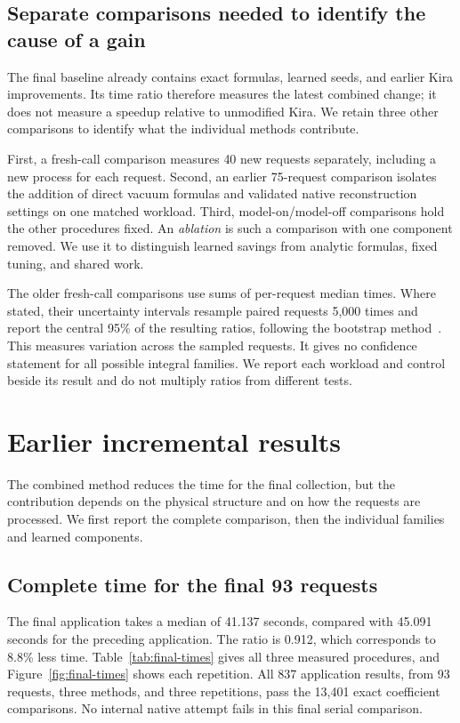 \subsection{Separate comparisons needed to identify the cause of a gain}
The final baseline already contains exact formulas, learned seeds, and earlier Kira improvements. Its time ratio therefore measures the latest combined change; it does not measure a speedup relative to unmodified Kira. We retain three other comparisons to identify what the individual methods contribute.

First, a fresh-call comparison measures 40 new requests separately, including a new process for each request. Second, an earlier 75-request comparison isolates the addition of direct vacuum formulas and validated native reconstruction settings on one matched workload. Third, model-on/model-off comparisons hold the other procedures fixed. An \emph{ablation} is such a comparison with one component removed. We use it to distinguish learned savings from analytic formulas, fixed tuning, and shared work.

The older fresh-call comparisons use sums of per-request median times. Where stated, their uncertainty intervals resample paired requests 5,000 times and report the central 95\% of the resulting ratios, following the bootstrap method~\cite{Efron1979}. This measures variation across the sampled requests. It gives no confidence statement for all possible integral families. We report each workload and control beside its result and do not multiply ratios from different tests.

\section{Earlier incremental results}
\label{app:latest-results}
The combined method reduces the time for the final collection, but the contribution depends on the physical structure and on how the requests are processed. We first report the complete comparison, then the individual families and learned components.

\subsection{Complete time for the final 93 requests}
The final application takes a median of 41.137 seconds, compared with 45.091 seconds for the preceding application. The ratio is 0.912, which corresponds to 8.8\% less time. Table~\ref{tab:final-times} gives all three measured procedures, and Figure~\ref{fig:final-times} shows each repetition. All 837 application results, from 93 requests, three methods, and three repetitions, pass the 13,401 exact coefficient comparisons. No internal native attempt fails in this final serial comparison.

